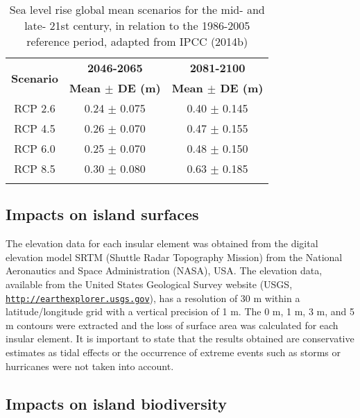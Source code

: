 \documentclass{article} %
\begin{document}
\begin{table}
\caption{Sea level rise global mean scenarios for the mid- and late- 21st century, in relation to the 1986-2005 reference period, adapted from IPCC (2014b)}
\begin{center}
\begin{tabular}{ccc}
\hline 
\multirow{2}{*}{\textbf{Scenario}} & \textbf{2046-2065} & \textbf{2081-2100} \\ 
 & \textbf{Mean $\pm$ DE (m)} & \textbf{Mean $\pm$ DE (m)} \\ 
\hline 
RCP 2.6 & 0.24 $\pm$ 0.075 & 0.40 $\pm$ 0.145 \\ 

RCP 4.5 & 0.26 $\pm$ 0.070 & 0.47 $\pm$ 0.155 \\ 

RCP 6.0 & 0.25 $\pm$ 0.070 & 0.48 $\pm$ 0.150 \\ 

RCP 8.5 & 0.30 $\pm$ 0.080 & 0.63 $\pm$ 0.185 \\ 
\hline 
\label{Tab:tab2} 
\end{tabular} 
\end{center}
\end{table}



\subsection{Impacts on island surfaces}

The elevation data for each insular element was obtained from the digital elevation
model SRTM (Shuttle Radar Topography Mission) from the National Aeronautics and
Space Administration (NASA), USA. The elevation data, available from the United
States Geological Survey website (USGS, \href{http://earthexplorer.usgs.gov}{\texttt{http://earthexplorer.usgs.gov}}), has a
resolution of 30 m within a latitude/longitude grid with a vertical precision of 1 m.
The 0 m, 1 m, 3 m, and 5 m contours were extracted and the loss of surface area
was calculated for each insular element. It is important to state that the results
obtained are conservative estimates as tidal effects or the occurrence of extreme
events such as storms or hurricanes were not taken into account.

\subsection{Impacts on island biodiversity}
\end{document}
